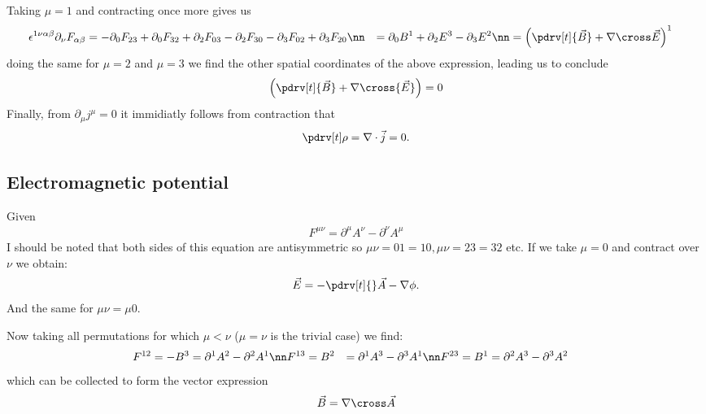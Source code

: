    Taking $\mu = 1$ and contracting once more gives us
   \begin{align}
    \epsilon^{1\nu\alpha\beta}\partial_\nu F_{\alpha\beta} &= -\partial_0F_{23}+\partial_0F_{32} +\partial_2F_{03} - \partial_2F_{30} -\partial_3F_{02}+\partial_3F_{20}\nn
    &= \partial_0 B^1 +\partial_2E^3 -\partial_3E^2\nn
    &= \left(\pdrv[t]{\vec B} + \nabla\cross\vec E\right)^1
   \end{align}
   doing the same for $\mu = 2$ and $\mu = 3$ we find the other spatial coordinates of the above expression, leading us to conclude
   \begin{align}
      \left(\pdrv[t]{\vec B} + \nabla\cross {\vec E}\right) = 0
   \end{align}
   Finally, from $\partial_\mu j^\mu = 0$ it immidiatly follows from contraction that
   \begin{align}
     \pdrv[t]\rho = \nabla\cdot\vec j = 0.
   \end{align}
   \subsection{Electromagnetic potential}
   Given
   \begin{align}
     F^{\mu\nu}= \partial^\mu A^\nu - \partial^\nu A^\mu
   \end{align}
   I should be noted that both sides of this equation are antisymmetric so $\mu\nu = 01 = 10, \mu\nu = 23 = 32$ etc.
   If we take $\mu = 0$ and contract over $\nu$ we obtain:
   \begin{align}
    \vec E = -\pdrv[t]{} \vec A-\nabla\phi.
   \end{align}
   And the same for $\mu\nu = \mu 0$.
   \par Now taking all permutations for which $\mu < \nu$ ($\mu = \nu$ is the trivial case) we find:
   \begin{align}
     F^{12} = -B^3 &=\partial^1A^2-\partial^2A^1\nn
     F^{13} = B^2 &= \partial^1A^3-\partial^3A^1\nn
     F^{23} = B^1 &= \partial^2A^3-\partial^3A^2
   \end{align}
   which can be collected to form the vector expression
   \begin{align}
     \vec B = \nabla \cross \vec A
   \end{align}
